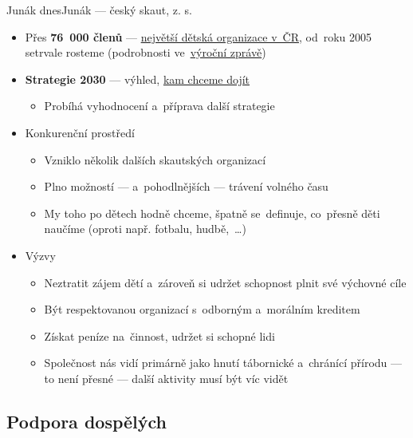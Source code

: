 \documentclass[compress, xelatex, 11pt, xcolor=dvipsnames, print, aspectratio=169,
	hyperref={
		bookmarks=true,
		unicode=true,
		colorlinks=true,
		pdftitle={Skautska vychovna metoda},
		plainpages=false,
		pdfauthor={Vojtech Zeisek},
		pdfsubject={Skautska vychovna metoda a jeji vyvoj za posledni stoleti a desetileti},
		pdfcreator={XeLaTeX},
		pdfkeywords={Junak, Pedagogika, Skaut, Skauting, Vychovna metoda},
		linkcolor=Red, %
		anchorcolor=ForestGreen, %
		citecolor=ForestGreen, %
		filecolor=ForestGreen, %
		menucolor=ForestGreen, %
		urlcolor=Sepia, %
		pdftex},
	url={hyphens, lowtilde} %
	]{beamer}
\begin{document}
\begin{frame}{Junák dnes}{Junák --- český skaut, z. s.}
	\begin{itemize}
		\item Přes \textbf{76~000 členů} --- \href{https://www.skaut.cz/skauting/}{největší dětská organizace v~ČR}, od~roku 2005 setrvale rosteme (podrobnosti ve~\href{https://www.skaut.cz/prectete-si-vyrocni-zpravu-junaka-ceskeho-skauta-za-rok-2022/}{výroční zprávě})
		\item \textbf{Strategie 2030} --- výhled, \href{https://krizovatka.skaut.cz/organizace/strategie/strategie-2030}{kam chceme dojít}
		\begin{itemize}
			\item Probíhá vyhodnocení a~příprava další strategie
		\end{itemize}
		\item Konkurenční prostředí
		\begin{itemize}
			\item Vzniklo několik dalších skautských organizací
			\item Plno možností --- a~pohodlnějších --- trávení volného času
			\item My toho po dětech hodně chceme, špatně se~definuje, co~přesně děti naučíme (oproti např. fotbalu, hudbě,~\ldots)
		\end{itemize}
		\item Výzvy
		\begin{itemize}
			\item Neztratit zájem dětí a~zároveň si udržet schopnost plnit své výchovné cíle
			\item Být respektovanou organizací s~odborným a~morálním kreditem
			\item Získat peníze na~činnost, udržet si schopné lidi
			\item Společnost nás vidí primárně jako hnutí tábornické a~chránící přírodu --- to není přesné --- další aktivity musí být víc vidět
		\end{itemize}
	\end{itemize}
\end{frame}

\subsection{Podpora dospělých}
\end{document}
